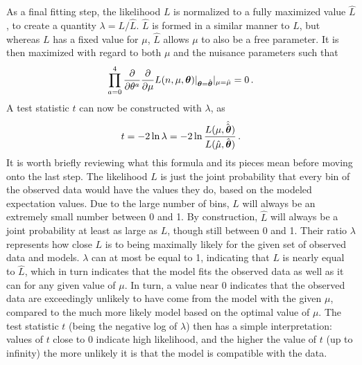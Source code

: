     As a final fitting step, the likelihood $L$ is normalized to a fully maximized value $\hat L$,
        to create a quantity $\lambda = L / \hat L$.
    $\hat L$ is formed in a similar manner to $L$, but whereas $L$ has a fixed value for $\mu$,
        $\hat L$ allows $\mu$ to also be a free parameter.
    It is then maximized with regard to both $\mu$ and the nuisance parameters such that
    \begin{equation}
        \prod \limits_{a=0}^{4} \frac{\partial}{\partial \theta^a}
        \frac{\partial}{\partial \mu} L(n,\mu,\boldsymbol{\theta}) |_{\boldsymbol{\theta}=\hat {\boldsymbol{\theta}}} |_{\mu=\hat \mu} = 0
        \,.
    \end{equation}
    A test statistic $t$ can now be constructed with $\lambda$, as
    \begin{equation}
        t = -2 \ln{\lambda} = -2 \ln{\frac{L(\mu, \hat {\hat {\boldsymbol{\theta}}})}{L(\hat \mu, \hat {\boldsymbol{\theta}})}}
        \,.
    \end{equation}
    It is worth briefly reviewing what this formula and its pieces mean before moving onto the last step.
    The likelihood $L$ is just the joint probability that every bin of the observed data would have the values they do,
        based on the modeled expectation values.
    Due to the large number of bins, $L$ will always be an extremely small number between 0 and 1.
    By construction, $\hat L$ will always be a joint probability at least as large as $L$, though still between 0 and 1.
    Their ratio $\lambda$ represents how close $L$ is to being maximally likely for the given set of observed data and models.
    $\lambda$ can at most be equal to 1, indicating that $L$ is nearly equal to $\hat L$,
        which in turn indicates that the model fits the observed data as well as it can for any given value of $\mu$.
    In turn, a value near 0 indicates that the observed data are exceedingly unlikely to have come from the model with the given $\mu$,
        compared to the much more likely model based on the optimal value of $\mu$.
    The test statistic $t$ (being the negative log of $\lambda$) then has a simple interpretation:
        values of $t$ close to 0 indicate high likelihood,
        and the higher the value of $t$ (up to infinity) the more unlikely it is that the model is compatible with the data.

